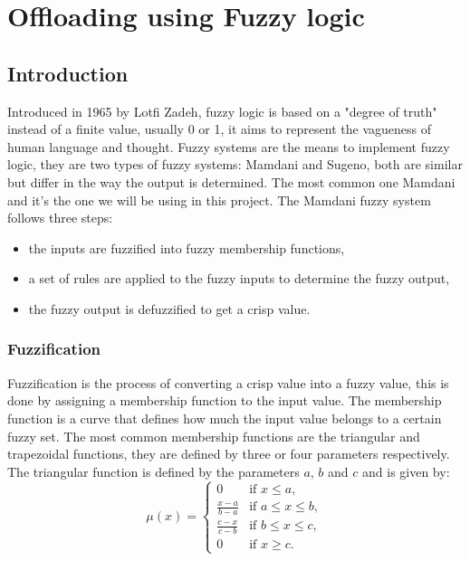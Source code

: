\chapter*{Offloading using Fuzzy logic}
\label{chap:fuzzy}

\section*{Introduction}

Introduced in 1965 by Lotfi Zadeh\cite{zadeh-1965}, fuzzy logic is based on a "degree of truth" instead of a finite value, usually 0 or 1, it aims to
represent the vagueness of human language and thought. Fuzzy systems are the means to implement fuzzy logic, they are two types of fuzzy systems:
Mamdani and Sugeno, both are similar but differ in the way the output is determined. The most common one Mamdani and it's the one we will be using in
this project. The Mamdani fuzzy system follows three steps:
\begin{itemize}
	\item the inputs are fuzzified into fuzzy membership functions,
	\item a set of rules are applied to the fuzzy inputs to determine the fuzzy output,
	\item the fuzzy output is defuzzified to get a crisp value.
\end{itemize}

\subsection*{Fuzzification}

Fuzzification is the process of converting a crisp value into a fuzzy value, this is done by assigning a membership function to the input value.
The membership function is a curve that defines how much the input value belongs to a certain fuzzy set. The most common membership functions are
the triangular and trapezoidal functions, they are defined by three or four parameters respectively. The triangular function is defined by the
parameters $a$, $b$ and $c$ and is given by:
\begin{equation}
	\mu(x) = \begin{cases}
		0                   & \text{if } x \leq a,        \\
		\frac{x - a}{b - a} & \text{if } a \leq x \leq b, \\
		\frac{c - x}{c - b} & \text{if } b \leq x \leq c, \\
		0                   & \text{if } x \geq c.
	\end{cases}
\end{equation}

